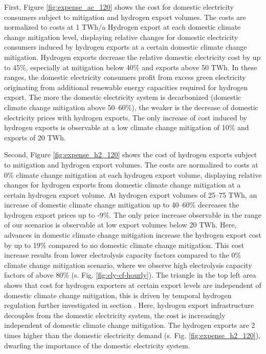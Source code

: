First, Figure \ref{fig:expense_ac_120} shows the cost for domestic electricity consumers subject to mitigation and hydrogen export volumes. The costs are normalized to costs at 1 TWh/a Hydrogen export at each domestic climate change mitigation level, displaying relative changes for domestic electricity consumers induced by hydrogen exports at a certain domestic climate change mitigation.
Hydrogen exports decrease the relative domestic electricity cost by up to 45\%, especially at mitigation below 40\% and exports above 50 TWh. 
In these ranges, the domestic electricity consumers profit from excess green electricity originating from additional renewable energy capacities required for hydrogen export.
The more the domestic electricity system is decarbonized (domestic climate change mitigation above 50--60\%), the weaker is the decrease of domestic electricity prices with hydrogen exports.
The only increase of cost induced by hydrogen exports is observable at a low climate change mitigation of 10\% and exports of 20 TWh. 

Second, Figure \ref{fig:expense_h2_120} shows the cost of hydrogen exports subject to mitigation and hydrogen export volumes. The costs are normalized to costs at 0\% climate change mitigation at each hydrogen export volume, displaying relative changes for hydrogen exports from domestic climate change mitigation at a certain hydrogen export volume.
At hydrogen export volumes of 25--75 TWh, an increase of domestic climate change mitigation up to 40--60\% decreases the hydrogen export prices up to -9\%. 
The only price increase observable in the range of our scenarios is observable at low export volumes below 20 TWh. Here, advances in domestic climate change mitigation increase the hydrogen export cost by up to 19\% compared to no domestic climate change mitigation.
This cost increase results from lower electrolysis capacity factors compared to the 0\% climate change mitigation scenario, where we observe high electrolysis capacity factors of above 80\% (s. Fig. \ref{fig:ely-cf-hourly}).
The triangle in the top left area shows that cost for hydrogen exporters at certain export levels are independent of domestic climate change mitigation, this is driven by temporal hydrogen regulation further investigated in section . Here, hydrogen export infrastructure decouples from the domestic electricity system, the cost is increasingly independent of domestic climate change mitigation. The hydrogen exports are 2 times higher than the domestic electricity demand (s. Fig. \ref{fig:expense_h2_120}), dwarfing the importance of the domestic electricity system.


